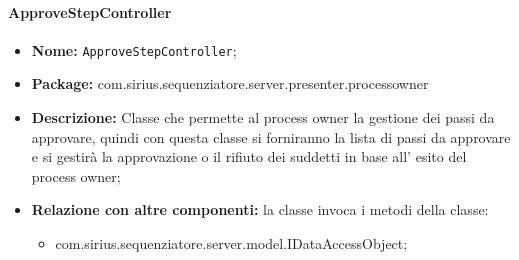 \paragraph{ApproveStepController}
	\begin{itemize}
		\item \textbf{Nome:} \texttt{ApproveStepController};
		\item \textbf{Package:} com.sirius.sequenziatore.server.presenter.processowner
		\item \textbf{Descrizione:} Classe che permette al process owner la gestione dei passi da approvare, quindi con questa classe si forniranno la lista di passi da approvare e si gestirà la approvazione o il rifiuto dei suddetti in base all' esito del process owner;
		\item \textbf{Relazione con altre componenti:} la classe invoca i metodi della classe:
		\begin{itemize}
			\item com.sirius.sequenziatore.server.model.IDataAccessObject;
		\end{itemize}
	\end{itemize}
